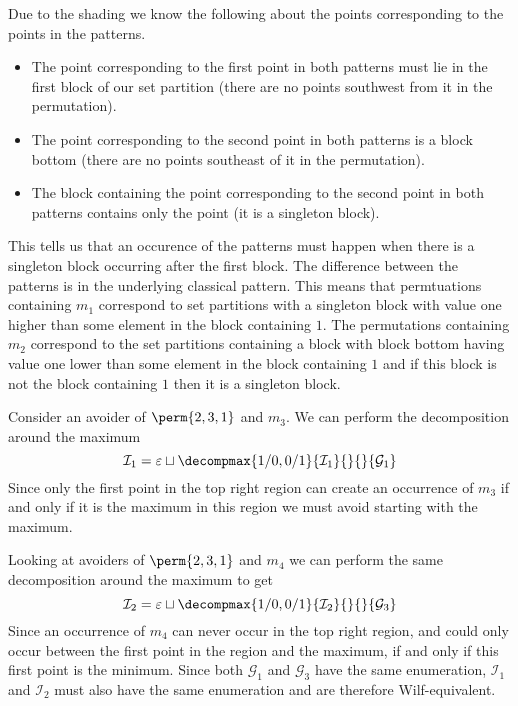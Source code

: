 Due to the shading we know the following about the points corresponding
to the points in the patterns.
\begin{itemize}
    \item The point corresponding to the first point in both patterns
        must lie in the first block of our set partition (there are
        no points southwest from it in the permutation).
    \item The point corresponding to the second point in both patterns
        is a block bottom (there are no points southeast of it in
        the permutation).
    \item The block containing the point corresponding to the second
        point in both patterns contains only the point (it is a singleton
        block).
\end{itemize}
This tells us that an occurence of the patterns must happen when there
is a singleton block occurring after the first block. The difference
between the patterns is in the underlying classical pattern. This
means that permtuations containing \(m_1\) correspond to set partitions
with a singleton block with value one higher than some element in the
block containing \(1\). The permutations containing \(m_2\) correspond
to the set partitions containing a block with block bottom having value
one lower than some element in the block containing \(1\) and if this
block is not the block containing \(1\) then it is a singleton block.

Consider an avoider of \(\perm{2,3,1}\) and \(m_3\). We can perform
the decomposition around the maximum
\begin{equation*}
    \mathcal{I}_1 = \varepsilon \sqcup
    \decompmax{1/0,0/1}{\mathcal{I}_1}{}{}{\mathcal{G}_1}
\end{equation*}
Since only the first point in the top right region can
create an occurrence of \(m_3\) if and only if it is the
maximum in this region we must avoid starting with the maximum.

Looking at avoiders of \(\perm{2,3,1}\) and \(m_4\) we
can perform the same decomposition around the maximum to get
\begin{equation*}
    \mathcal{I}_2 = \varepsilon \sqcup
    \decompmax{1/0,0/1}{\mathcal{I}_2}{}{}{\mathcal{G}_3}
\end{equation*}
Since an occurrence of \(m_4\) can never occur in the
top right region, and could only occur between the first point
in the region and the maximum, if and only if this first point is the minimum.
Since both \(\mathcal{G}_1\) and \(\mathcal{G}_3\) have the same
enumeration, \(\mathcal{I}_1\) and \(\mathcal{I}_2\) must also have
the same enumeration and are therefore Wilf-equivalent.

